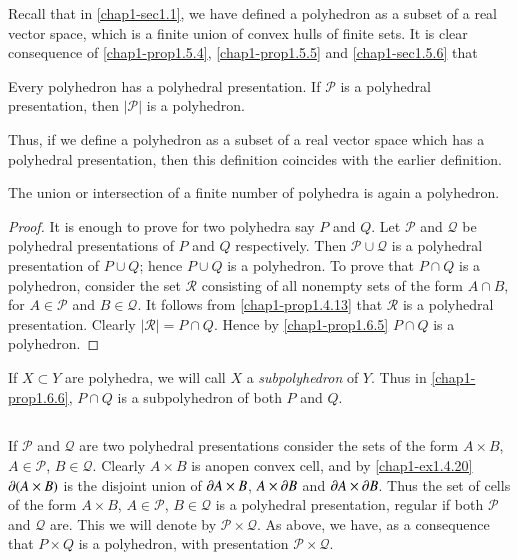 Recall that in \ref{chap1-sec1.1}, we have defined a polyhedron as a subset of a real vector space, which is a finite union of convex hulls of finite sets. It is clear consequence of \ref{chap1-prop1.5.4}, \ref{chap1-prop1.5.5} and 
\ref{chap1-sec1.5.6} that

\begin{proposition}\label{chap1-prop1.6.5}
Every polyhedron has a polyhedral presentation. If $\mathscr{P}$ is a polyhedral presentation, then $|\mathscr{P}|$ is a polyhedron.
\end{proposition}

Thus, if we define a polyhedron as a subset of a real vector space which has a polyhedral presentation, then this definition coincides with the earlier definition. 

\begin{proposition}\label{chap1-prop1.6.6}
The union or intersection of a finite number of polyhedra is again a polyhedron. 
\end{proposition}

\begin{proof}
It is enough to prove for two polyhedra say $P$ and $Q$. Let $\mathscr{P}$ and $\mathcal{Q}$ be polyhedral presentations of $P$ and $Q$ respectively. Then $\mathscr{P}\cup \mathcal{Q}$ is a polyhedral presentation of $P\cup Q$; hence $P\cup Q$ is a polyhedron. To prove that $P\cap Q$ is a polyhedron, consider the set $\mathscr{R}$ consisting of all nonempty sets of the form $A\cap B$, for $A\in \mathscr{P}$ and $B\in\mathcal{Q}$. It follows from \ref{chap1-prop1.4.13} that $\mathscr{R}$ is a polyhedral presentation. Clearly $|\mathscr{R}|=P\cap Q$. Hence by \ref{chap1-prop1.6.5} $P\cap Q$ is a polyhedron.
\end{proof}

If $X \subset Y$ are polyhedra, we will call $X$ a {\em subpolyhedron} of $Y$. Thus in \ref{chap1-prop1.6.6}, $P\cap Q$ is a subpolyhedron of both $P$ and $Q$. 

\setcounter{subsection}{6}
\subsection{}\label{chap1-sec1.6.7}
If $\mathscr{P}$ and $\mathcal{Q}$ are two polyhedral presentations consider the sets of the form $A\times B$, $A\in \mathscr{P}$, $B\in \mathcal{Q}$. Clearly $A\times B$ is an\pageoriginale open convex cell, and by \ref{chap1-ex1.4.20} $\partial (A\times B)$ is the disjoint union of $\partial A\times B$, $A\times \partial B$ and $\partial A\times \partial B$. Thus the set of cells of the form $A\times B$, $A\in \mathscr{P}$, $B\in \mathcal{Q}$ is a polyhedral presentation, regular if both $\mathscr{P}$ and $\mathcal{Q}$ are. This we will denote by $\mathscr{P}\times \mathcal{Q}$. As above, we have, as a consequence that $P\times Q$ is a polyhedron, with presentation $\mathscr{P}\times \mathcal{Q}$.

